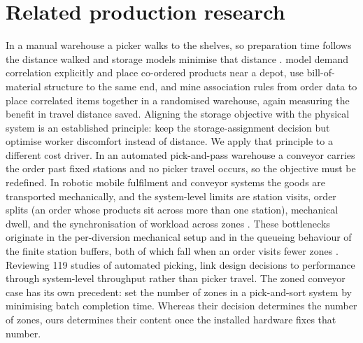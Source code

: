 \documentclass[]{interact}
\begin{document}
\section{Related production research}\label{sec:litreview}
In a manual warehouse a picker walks to the shelves, so preparation time follows the distance walked and storage models minimise that distance \citep{islam2023, wang2020}. \citet{zhang2019cie} model demand correlation explicitly and place co-ordered products near a depot, \citet{xiao2010correlated} use bill-of-material structure to the same end, and \citet{pang2017datamining} mine association rules from order data to place correlated items together in a randomised warehouse, again measuring the benefit in travel distance saved. Aligning the storage objective with the physical system is an established principle: \citet{larco2017discomfort} keep the storage-assignment decision but optimise worker discomfort instead of distance. We apply that principle to a different cost driver. In an automated pick-and-pass warehouse a conveyor carries the order past fixed stations and no picker travel occurs, so the objective must be redefined. In robotic mobile fulfilment and conveyor systems the goods are transported mechanically, and the system-level limits are station visits, order splits (an order whose products sit across more than one station), mechanical dwell, and the synchronisation of workload across zones \citep{azadeh2019, xie2021}. These bottlenecks originate in the per-diversion mechanical setup and in the queueing behaviour of the finite station buffers, both of which fall when an order visits fewer zones \citep{zhu2021, kim2020}. Reviewing 119 studies of automated picking, \citet{jaghbeer2020automated} link design decisions to performance through system-level throughput rather than picker travel. The zoned conveyor case has its own precedent: \citet{dekoster2012zones} set the number of zones in a pick-and-sort system by minimising batch completion time. Whereas their decision determines the number of zones, ours determines their content once the installed hardware fixes that number.
\end{document}

